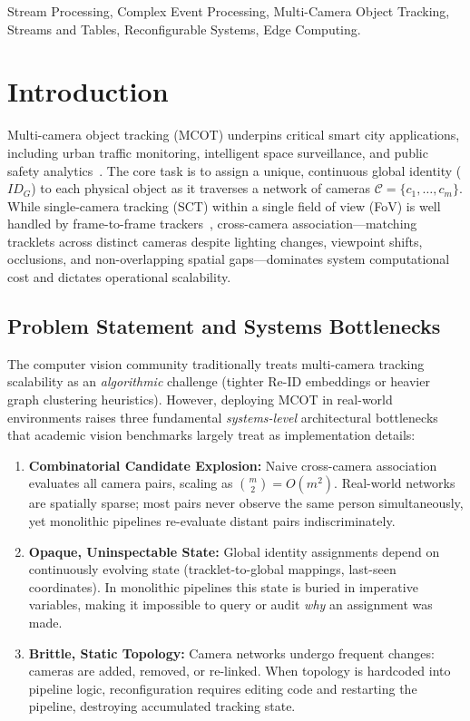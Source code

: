 \documentclass[conference]{IEEEtran}
\begin{document}
\begin{IEEEkeywords}
Stream Processing, Complex Event Processing, Multi-Camera Object Tracking, Streams and Tables, Reconfigurable Systems, Edge Computing.
\end{IEEEkeywords}

\section{Introduction}
\label{sec:intro}
Multi-camera object tracking (MCOT) underpins critical smart city applications, including urban traffic monitoring, intelligent space surveillance, and public safety analytics~\cite{yoshida2024overlap,kim2024cluster,xie2024robust}. The core task is to assign a unique, continuous global identity ($ID_G$) to each physical object as it traverses a network of cameras $\mathcal{C} = \{c_1,\dots,c_m\}$. While single-camera tracking (SCT) within a single field of view (FoV) is well handled by frame-to-frame trackers~\cite{yoshida2024overlap}, cross-camera association---matching tracklets across distinct cameras despite lighting changes, viewpoint shifts, occlusions, and non-overlapping spatial gaps---dominates system computational cost and dictates operational scalability.

\subsection{Problem Statement and Systems Bottlenecks}
The computer vision community traditionally treats multi-camera tracking scalability as an \emph{algorithmic} challenge (tighter Re-ID embeddings or heavier graph clustering heuristics). However, deploying MCOT in real-world environments raises three fundamental \emph{systems-level} architectural bottlenecks that academic vision benchmarks largely treat as implementation details:
\begin{enumerate}
    \item \textbf{Combinatorial Candidate Explosion:} Naive cross-camera association evaluates all camera pairs, scaling as $\binom{m}{2} = O(m^2)$. Real-world networks are spatially sparse; most pairs never observe the same person simultaneously, yet monolithic pipelines re-evaluate distant pairs indiscriminately.
    \item \textbf{Opaque, Uninspectable State:} Global identity assignments depend on continuously evolving state (tracklet-to-global mappings, last-seen coordinates). In monolithic pipelines this state is buried in imperative variables, making it impossible to query or audit \emph{why} an assignment was made.
    \item \textbf{Brittle, Static Topology:} Camera networks undergo frequent changes: cameras are added, removed, or re-linked. When topology is hardcoded into pipeline logic, reconfiguration requires editing code and restarting the pipeline, destroying accumulated tracking state.
\end{enumerate}
\end{document}
